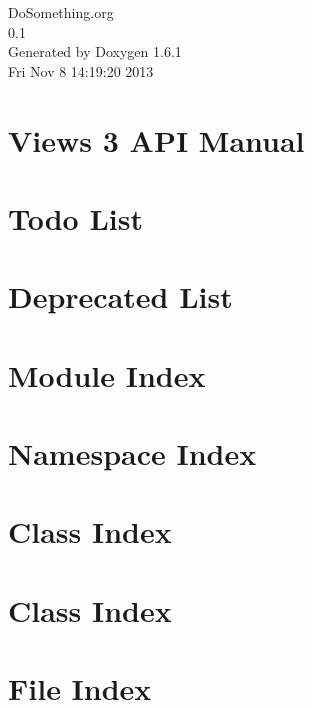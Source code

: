 \documentclass[a4paper]{book}
\begin{document}
\hypersetup{pageanchor=false}
\begin{titlepage}
\vspace*{7cm}
\begin{center}
{\Large DoSomething.org \\[1ex]\large 0.1 }\\
\vspace*{1cm}
{\large Generated by Doxygen 1.6.1}\\
\vspace*{0.5cm}
{\small Fri Nov 8 14:19:20 2013}\\
\end{center}
\end{titlepage}
\clearemptydoublepage
{}
\tableofcontents
\clearemptydoublepage
{}
\hypersetup{pageanchor=true}
\chapter{Views 3 API Manual}
\label{index}\hypertarget{index}{}
\chapter{Todo List}
\label{todo}
\hypertarget{todo}{}

\chapter{Deprecated List}
\label{deprecated}
\hypertarget{deprecated}{}

\chapter{Module Index}

\chapter{Namespace Index}

\chapter{Class Index}

\chapter{Class Index}

\chapter{File Index}

\end{document}

